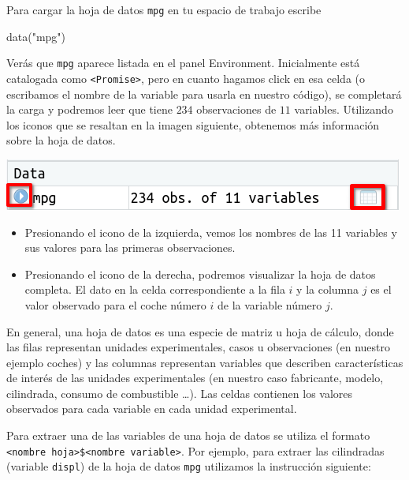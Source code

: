 \documentclass[
  degree=mecinf,
  title=normal,
  toc=normal,
  bib=normal]{mnye}
\newenvironment{Shaded}{\begin{snugshade}}{\end{snugshade}}
\newcommand{\FunctionTok}[1]{\textcolor[rgb]{0.00,0.00,0.00}{#1}}
\newcommand{\NormalTok}[1]{#1}
\newcommand{\StringTok}[1]{\textcolor[rgb]{0.31,0.60,0.02}{#1}}
\begin{document}
Para cargar la hoja de datos \texttt{mpg} en tu espacio de trabajo escribe

\begin{Shaded}
\begin{Highlighting}[]
\FunctionTok{data}\NormalTok{(}\StringTok{"mpg"}\NormalTok{)}
\end{Highlighting}
\end{Shaded}

Verás que \texttt{mpg} aparece listada en el panel Environment. Inicialmente está catalogada como \texttt{\textless{}Promise\textgreater{}}, pero en cuanto hagamos click en esa celda (o escribamos el nombre de la variable para usarla en nuestro código), se completará la carga y podremos leer que tiene \(234\) observaciones de \(11\) variables. Utilizando los iconos que se resaltan en la imagen siguiente, obtenemos más información sobre la hoja de datos.

\begin{center}\includegraphics[width=0.6\linewidth]{images/df} \end{center}

\begin{itemize}
\item
  Presionando el icono de la izquierda, vemos los nombres de las 11 variables y sus valores para las primeras observaciones.
\item
  Presionando el icono de la derecha, podremos visualizar la hoja de datos completa. El dato en la celda correspondiente a la fila \(i\) y la columna \(j\) es el valor observado para el coche número \(i\) de la variable número \(j\).
\end{itemize}

En general, una hoja de datos es una especie de matriz u hoja de cálculo, donde las filas representan unidades experimentales, casos u observaciones (en nuestro ejemplo coches) y las columnas representan variables que describen características de interés de las unidades experimentales (en nuestro caso fabricante, modelo, cilindrada, consumo de combustible \ldots). Las celdas contienen los valores observados para cada variable en cada unidad experimental.

Para extraer una de las variables de una hoja de datos se utiliza el formato \texttt{\textless{}nombre\ hoja\textgreater{}\$\textless{}nombre\ variable\textgreater{}}. Por ejemplo, para extraer las cilindradas (variable \texttt{displ}) de la hoja de datos \texttt{mpg} utilizamos la instrucción siguiente:
\end{document}
